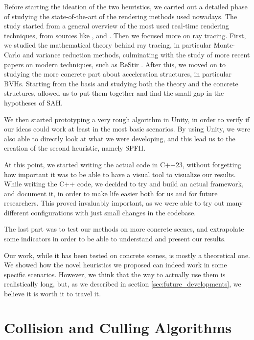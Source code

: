 \documentclass{PoliMi_MasterThesis}
\begin{document}
Before starting the ideation of the two heuristics, we carried out a detailed phase of studying the state-of-the-art of the rendering methods used nowadays. The study started from a general overview of the most used real-time rendering techniques, from sources like \cite{real_time_rendering_book}, \cite{pbr_book} and \cite{ray_tracing_gems_book}. Then we focused more on ray tracing. First, we studied the mathematical theory behind ray tracing, in particular Monte-Carlo and variance reduction methods, culminating with the study of more recent papers on modern techniques, such as ReStir \cite{restir}. After this, we moved on to studying the more concrete part about acceleration structures, in particular BVHs. Starting from the basis and studying both the theory and the concrete structures, allowed us to put them together and find the small gap in the hypotheses of SAH.

We then started prototyping a very rough algorithm in Unity, in order to verify if our ideas could work at least in the most basic scenarios. By using Unity, we were also able to directly look at what we were developing, and this lead us to the creation of the second heuristic, namely SPFH. 

At this point, we started writing the actual code in C++23, without forgetting how important it was to be able to have a visual tool to visualize our results. While writing the C++ code, we decided to try and build an actual framework, and document it, in order to make life easier both for us and for future researchers. This proved invaluably important, as we were able to try out many different configurations with just small changes in the codebase.

The last part was to test our methods on more concrete scenes, and extrapolate some indicators in order to be able to understand and present our results.

Our work, while it has been tested on concrete scenes, is mostly a theoretical one. We showed how the novel heuristics we proposed can indeed work in some specific scenarios. However, we think that the way to actually use them is realistically long, but, as we described in section \ref{sec:future_developments}, we believe it is worth it to travel it. 

\cleardoublepage
{} %
\appendix

\chapter{Collision and Culling Algorithms}
\end{document}
